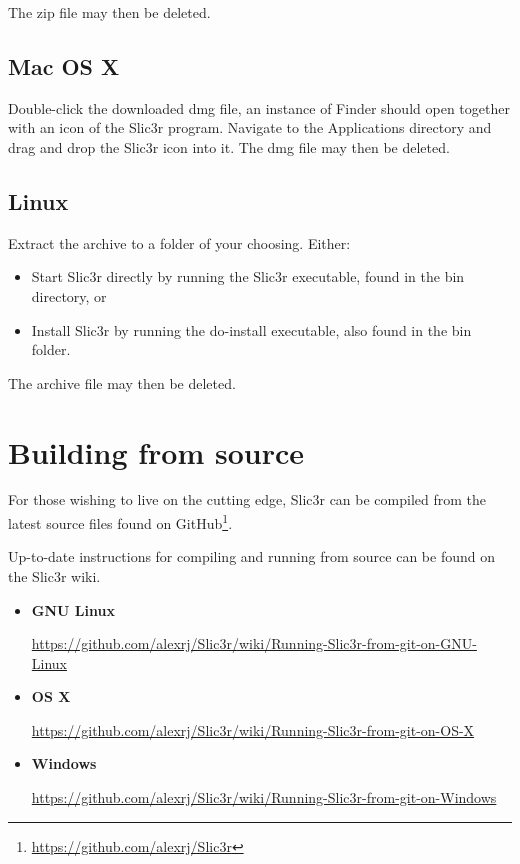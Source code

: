 The zip file may then be deleted.

\subsection{Mac OS X}

Double-click the downloaded dmg file, an instance of Finder should open together with an icon of the Slic3r program.  Navigate to the Applications directory and drag and drop the Slic3r icon into it.
The dmg file may then be deleted.

\subsection{Linux}

Extract the archive to a folder of your choosing.
Either:
\begin{itemize}
\item Start Slic3r directly by running the Slic3r executable, found in the bin directory, or
\item Install Slic3r by running the do-install executable, also found in the bin folder.
\end{itemize}
The archive file may then be deleted.



\section{Building from source} %
\label{sec:building_from_source}

For those wishing to live on the cutting edge, Slic3r can be compiled from the latest source files found on GitHub\footnote{\url{https://github.com/alexrj/Slic3r}}.

Up-to-date instructions for compiling and running from source can be found on the Slic3r wiki.

\begin{itemize}
    \item \textbf{GNU Linux} \par\url{https://github.com/alexrj/Slic3r/wiki/Running-Slic3r-from-git-on-GNU-Linux}
    \item \textbf{OS X} \par\url{https://github.com/alexrj/Slic3r/wiki/Running-Slic3r-from-git-on-OS-X}
    \item \textbf{Windows} \par\url{https://github.com/alexrj/Slic3r/wiki/Running-Slic3r-from-git-on-Windows}

\end{itemize}
